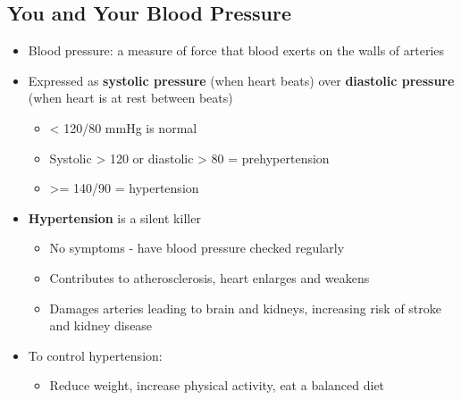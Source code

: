\documentclass[12pt]{article}
\begin{document}
        \subsection{You and Your Blood Pressure}
            \begin{itemize}
                \item Blood pressure: a measure of force that blood exerts on the walls of arteries
                \item Expressed as \textbf{systolic pressure} (when heart beats) over \textbf{diastolic pressure} (when heart is at rest between beats)
                    \begin{itemize}
                        \item < 120/80 mmHg is normal
                        \item Systolic > 120 or diastolic > 80 = prehypertension
                        \item >= 140/90 = hypertension
                    \end{itemize}
                \item \textbf{Hypertension} is a silent killer
                    \begin{itemize}
                        \item No symptoms - have blood pressure checked regularly
                        \item Contributes to atherosclerosis, heart enlarges and weakens
                        \item Damages arteries leading to brain and kidneys, increasing risk of stroke and kidney disease
                    \end{itemize}
                \item To control hypertension:
                    \begin{itemize}
                        \item Reduce weight, increase physical activity, eat a balanced diet
                    \end{itemize}
            \end{itemize}
\end{document}
